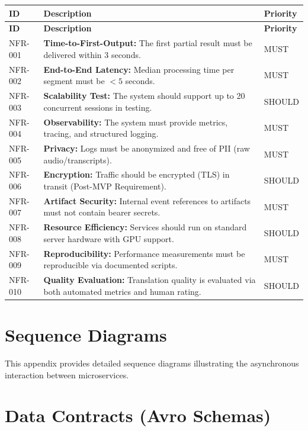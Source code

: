 \begin{longtable}{|l|p{10cm}|l|}
\hline
\textbf{ID} & \textbf{Description} & \textbf{Priority} \\ \hline
\endfirsthead
\hline
\textbf{ID} & \textbf{Description} & \textbf{Priority} \\ \hline
\endhead
\hline
\endfoot

NFR-001 & \textbf{Time-to-First-Output:} The first partial result must be delivered within 3 seconds. & MUST \\ \hline
NFR-002 & \textbf{End-to-End Latency:} Median processing time per segment must be $< 5$ seconds. & MUST \\ \hline
NFR-003 & \textbf{Scalability Test:} The system should support up to 20 concurrent sessions in testing. & SHOULD \\ \hline
NFR-004 & \textbf{Observability:} The system must provide metrics, tracing, and structured logging. & MUST \\ \hline
NFR-005 & \textbf{Privacy:} Logs must be anonymized and free of PII (raw audio/transcripts). & MUST \\ \hline
NFR-006 & \textbf{Encryption:} Traffic should be encrypted (TLS) in transit (Post-MVP Requirement). & SHOULD \\ \hline
NFR-007 & \textbf{Artifact Security:} Internal event references to artifacts must not contain bearer secrets. & MUST \\ \hline
NFR-008 & \textbf{Resource Efficiency:} Services should run on standard server hardware with GPU support. & SHOULD \\ \hline
NFR-009 & \textbf{Reproducibility:} Performance measurements must be reproducible via documented scripts. & MUST \\ \hline
NFR-010 & \textbf{Quality Evaluation:} Translation quality is evaluated via both automated metrics and human rating. & SHOULD \\ \hline
\end{longtable}

\chapter{Sequence Diagrams}
\label{app:sequences}

This appendix provides detailed sequence diagrams illustrating the asynchronous interaction between microservices.


\chapter{Data Contracts (Avro Schemas)}
\label{app:schemas}

